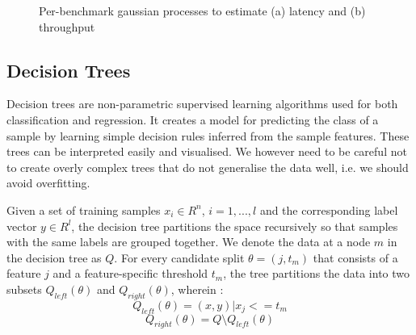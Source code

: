 \begin{figure}
\centering
{}
%

\caption{Per-benchmark gaussian processes to estimate (a) latency and
  (b) throughput}
\label{fig:gp_r2}
\end{figure}


\subsection{Decision Trees}
\label{sec:dt}

Decision trees are non-parametric supervised learning algorithms used for
both classification and regression. 
It creates a model for predicting the class of a sample by learning
simple decision rules inferred from the sample features\citep{stats01}.
These trees can be interpreted easily and visualised.
We however need to be careful not to create overly complex trees 
that do not generalise the data well, i.e. we should avoid overfitting. 

Given a set of training samples $x_i \in R^n$, $i=1,...,l$ and the
corresponding label vector $y \in R^l$, the decision tree partitions 
the space recursively so that samples with the same labels are grouped
together.
We denote the data at a node $m$ in the decision tree as $Q$. For
every candidate split $\theta = (j, t_m)$ that consists of a feature $j$ 
and a feature-specific threshold $t_m$, the tree partitions the data into
two subsets $Q_{left}(\theta)$ and $Q_{right}(\theta)$, wherein :
$$Q_{left}(\theta) = {(x, y) | x_j <= t_m}$$ 
$$Q_{right}(\theta) = Q \setminus Q_{left}(\theta)$$

